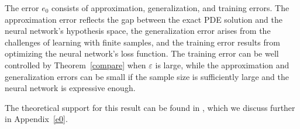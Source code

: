 The error \( e_0 \) consists of approximation, generalization, and training errors. The approximation error reflects the gap between the exact PDE solution and the neural network's hypothesis space, the generalization error arises from the challenges of learning with finite samples, and the training error results from optimizing the neural network's loss function. The training error can be well controlled by Theorem~\ref{compare} when \( \varepsilon \) is large, while the approximation and generalization errors can be small if the sample size is sufficiently large and the neural network is expressive enough.  

The theoretical support for this result can be found in \cite{yang2023nearly,yang2024deeper}, which we discuss further in Appendix~\ref{e0}.








